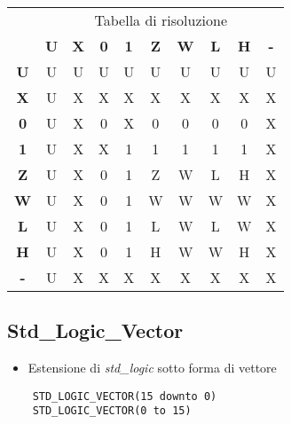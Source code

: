 \documentclass{article}
\begin{document}
\begin{table}[htb]
\centering
\begin{tabular}{cccccccccc}
\multicolumn{1}{l}{} & \multicolumn{9}{c}{Tabella di risoluzione}                                                                         \\
                     & \textbf{U} & \textbf{X} & \textbf{0} & \textbf{1} & \textbf{Z} & \textbf{W} & \textbf{L} & \textbf{H} & \textbf{-} \\
\textbf{U}           & U          & U          & U          & U          & U          & U          & U          & U          & U          \\
\textbf{X}           & U          & X          & X          & X          & X          & X          & X          & X          & X          \\
\textbf{0}           & U          & X          & 0          & X          & 0          & 0          & 0          & 0          & X          \\
\textbf{1}           & U          & X          & X          & 1          & 1          & 1          & 1          & 1          & X          \\
\textbf{Z}           & U          & X          & 0          & 1          & Z          & W          & L          & H          & X          \\
\textbf{W}           & U          & X          & 0          & 1          & W          & W          & W          & W          & X          \\
\textbf{L}           & U          & X          & 0          & 1          & L          & W          & L          & W          & X          \\
\textbf{H}           & U          & X          & 0          & 1          & H          & W          & W          & H          & X          \\
\textbf{-}           & U          & X          & X          & X          & X          & X          & X          & X          & X         
\end{tabular}
\end{table}

\subsection{Std\_Logic\_Vector}
\begin{itemize}
	\item Estensione di \textit{std\_logic} sotto forma di vettore
\end{itemize}
\begin{verbatim}
    STD_LOGIC_VECTOR(15 downto 0)
    STD_LOGIC_VECTOR(0 to 15)
\end{verbatim}
\end{document}
